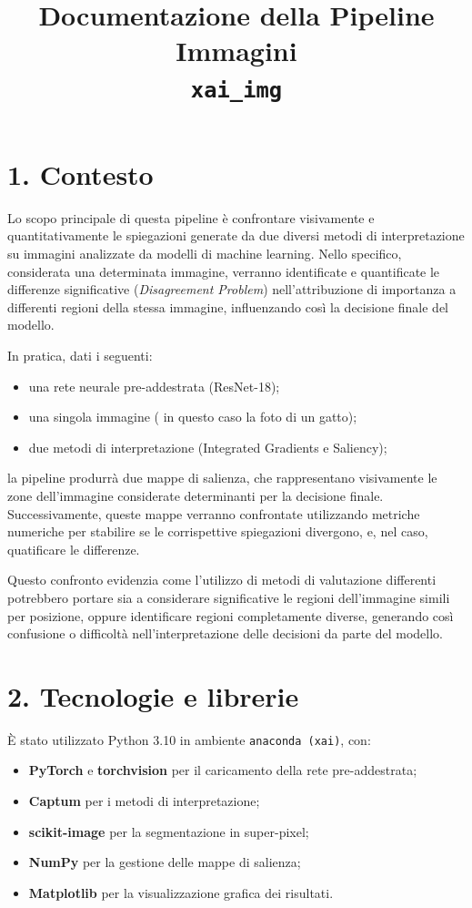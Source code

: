 \documentclass[a4paper,11pt]{article}
\title{Documentazione della Pipeline Immagini \\ \texttt{xai\_img}}
\begin{document}
\maketitle

\section*{1. Contesto}
Lo scopo principale di questa pipeline è confrontare visivamente e quantitativamente le spiegazioni generate da due diversi metodi di interpretazione su immagini analizzate da modelli di machine learning. Nello specifico, considerata una determinata immagine, verranno identificate e quantificate le differenze significative (\emph{Disagreement Problem}) nell'attribuzione di importanza a differenti regioni della stessa immagine, influenzando così la decisione finale del modello.

In pratica, dati i seguenti:
\begin{itemize}
\item una rete neurale pre-addestrata (ResNet-18);
\item una singola immagine ( in questo caso la foto di un gatto);
\item due metodi di interpretazione (Integrated Gradients e Saliency);
\end{itemize}
la pipeline produrrà due mappe di salienza, che rappresentano visivamente le zone dell'immagine considerate determinanti per la decisione finale. Successivamente, queste mappe verranno confrontate utilizzando metriche numeriche per stabilire se le corrispettive spiegazioni divergono, e, nel caso, quatificare le differenze.

Questo confronto evidenzia come l'utilizzo di metodi di valutazione differenti potrebbero portare sia a considerare significative le regioni dell'immagine simili per posizione, oppure identificare regioni completamente diverse, generando così confusione o difficoltà nell'interpretazione delle decisioni da parte del modello.

\section*{2. Tecnologie e librerie}
È stato utilizzato Python 3.10 in ambiente \texttt{anaconda (xai)}, con:
\begin{itemize}
\item \textbf{PyTorch} e \textbf{torchvision} per il caricamento della rete pre-addestrata;
\item \textbf{Captum} per i metodi di interpretazione;
\item \textbf{scikit-image} per la segmentazione in super-pixel;
\item \textbf{NumPy} per la gestione delle mappe di salienza;
\item \textbf{Matplotlib} per la visualizzazione grafica dei risultati.
\end{itemize}
\end{document}
